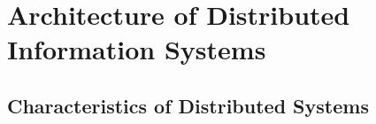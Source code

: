 \documentclass[ieeetran]{article}
\begin{document}
\pagebreak
\section{Architecture of Distributed Information Systems} %
\label{sec:architecture_of_distributed_information_systems}

\subsection{Characteristics of Distributed Systems} %
\label{sub:characteristics_of_distributed_systems}





























































\end{document}
